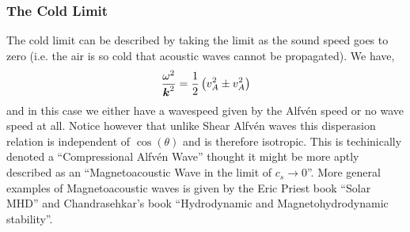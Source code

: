 \documentclass{article}
\begin{document}
\subsubsection{The Cold Limit}
The cold limit can be described by taking the limit as the sound speed goes to
zero (i.e. the air is so cold that acoustic waves cannot be propagated).  We
have, 
\begin{gather*}
    \frac{\omega^2}{\boldsymbol{k}^2} = \frac{1}{2}\left(v_A^2\pm v_A^2\right)
\end{gather*}
and in this case we either have a wavespeed given by the Alfv\'en speed or no wave
speed at all. Notice however that unlike Shear Alfv\'en waves this disperasion
relation is independent of $\cos(\theta)$ and is therefore isotropic. This is
techinically denoted a ``Compressional Alfv\'en Wave'' thought it might be more
aptly described as an ``Magnetoacoustic Wave in the limit of $c_s \to 0$''. More
general examples of Magnetoacoustic waves is given by the Eric Priest book
``Solar MHD'' and Chandrasehkar's book ``Hydrodynamic and Magnetohydrodynamic
stability''. 
\end{document}
